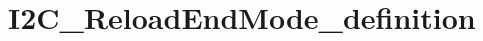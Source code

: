 \hypertarget{group___i2_c___reload_end_mode__definition}{\section{I2\-C\-\_\-\-Reload\-End\-Mode\-\_\-definition}
\label{group___i2_c___reload_end_mode__definition}
}
